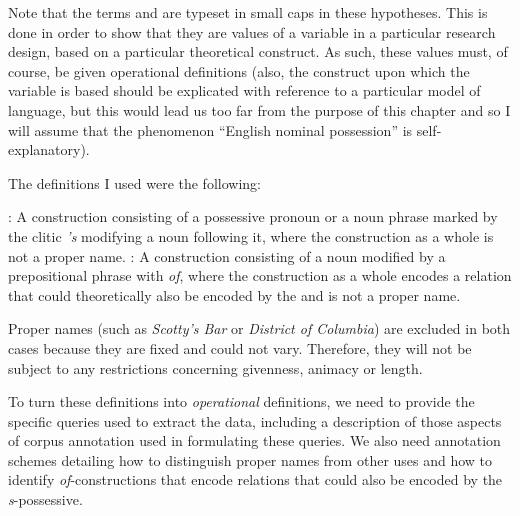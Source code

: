Note that the terms   and  are typeset in small caps in these hypotheses.  This is done in order to show that they are values of a variable in a particular research design,  based on a particular theoretical construct. As such, these values must, of course, be given operational  definitions (also, the construct upon which the variable is based should be explicated with reference to a particular model of language, but this would lead us too far from the purpose of this chapter and so I will assume that the phenomenon ``English nominal  possession'' is self\hyp{}explanatory).

The definitions I used were the following:

\begin{exe}
\ex
\begin{xlist}
\label{ex:sgenofcdefinition}
\ex {}:  A construction consisting of a possessive pronoun  or a noun  phrase marked by the clitic  \textit{'s} modifying a noun following it, where the construction as a whole is not a proper name.
\ex {}: A construction consisting of a noun modified by a pre\-positional  phrase with \textit{of}, where the construction as a whole encodes a relation that could theoretically also be encoded by the  and is not a proper name.
\end{xlist}
\end{exe}

Proper names (such as \textit{Scotty's Bar} or \textit{District of Columbia}) are excluded in both cases because they are fixed and could not vary. Therefore, they will not be subject to any restrictions concerning givenness,  animacy  or  length.

To turn these definitions into \emph{operational}  definitions, we need to provide the specific queries  used to extract  the data, including a description of those aspects of corpus annotation  used in formulating these queries. We also need annotation schemes detailing how to distinguish proper names from other uses and how to identify \textit{of}-constructions that encode relations that could also be encoded by the  \textit{s}-possessive.

